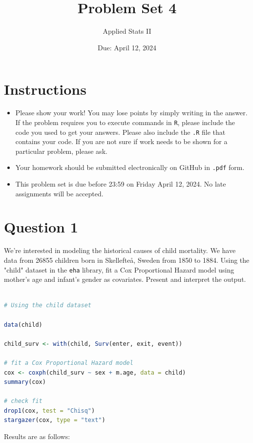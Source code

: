 \documentclass[12pt,letterpaper]{article}
\title{Problem Set 4}
\date{Due: April 12, 2024}
\author{Applied Stats II}
\begin{document}
	\maketitle
	\section*{Instructions}
	\begin{itemize}
	\item Please show your work! You may lose points by simply writing in the answer. If the problem requires you to execute commands in \texttt{R}, please include the code you used to get your answers. Please also include the \texttt{.R} file that contains your code. If you are not sure if work needs to be shown for a particular problem, please ask.
	\item Your homework should be submitted electronically on GitHub in \texttt{.pdf} form.
	\item This problem set is due before 23:59 on Friday April 12, 2024. No late assignments will be accepted.

	\end{itemize}

	\vspace{.25cm}
\section*{Question 1}
\vspace{.25cm}
\noindent We're interested in modeling the historical causes of child mortality. We have data from 26855 children born in Skellefteå, Sweden from 1850 to 1884. Using the "child" dataset in the \texttt{eha} library, fit a Cox Proportional Hazard model using mother's age and infant's gender as covariates. Present and interpret the output.


\begin{lstlisting}[language=R]

# Using the child dataset 

data(child)

child_surv <- with(child, Surv(enter, exit, event))

# fit a Cox Proportional Hazard model 
cox <- coxph(child_surv ~ sex + m.age, data = child)
summary(cox)

# check fit
drop1(cox, test = "Chisq")
stargazer(cox, type = "text")

\end{lstlisting}

\newpage
\noindent Results are as follows:
\end{document}
